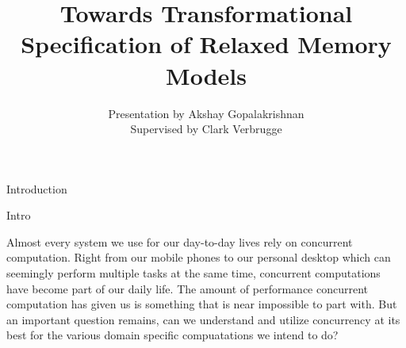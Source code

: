 \documentclass[notes, xcolor = dvipsnames]{beamer}
\title{Towards Transformational Specification of Relaxed Memory Models}
\author{Presentation by Akshay Gopalakrishnan \\ Supervised by Clark Verbrugge}
\begin{document}
    
    \begin{frame}

        \maketitle

    \end{frame}

    
    \begin{frame}{Introduction}


    \end{frame}

    \begin{frame}{Intro}
        
        Almost every system we use for our day-to-day lives rely on concurrent computation. 
        Right from our mobile phones to our personal desktop which can seemingly perform multiple tasks at the same time, concurrent computations have become part of our daily life.
        The amount of performance concurrent computation has given us is something that is near impossible to part with. 
        But an important question remains, can we understand and utilize concurrency at its best for the various domain specific compuatations we intend to do?
    
    \end{frame}
\end{document}
